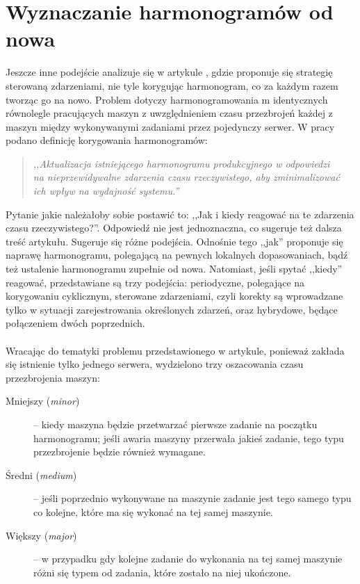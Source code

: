 \documentclass[archivemode]{mgr}
\begin{document}
\section{Wyznaczanie harmonogramów od nowa}
Jeszcze inne podejście analizuje się w artykule \cite{EDSBCR}, gdzie proponuje się strategię sterowaną zdarzeniami, nie tyle korygując harmonogram, co za każdym razem tworząc go na nowo. Problem dotyczy harmonogramowania m identycznych równolegle pracujących maszyn z uwzględnieniem czasu przezbrojeń każdej z maszyn między wykonywanymi zadaniami przez pojedynczy serwer. W pracy podano definicję korygowania harmonogramów:
\begin{quotation}
\emph{,,Aktualizacja istniejącego harmonogramu produkcyjnego w odpowiedzi\\ na nieprzewidywalne zdarzenia czasu rzeczywistego, aby zminimalizować\\ ich wpływ na wydajność systemu.''}
\end{quotation}
Pytanie jakie należałoby sobie postawić to: ,,Jak i kiedy reagować na te zdarzenia czasu rzeczywistego?''. Odpowiedź nie jest jednoznaczna, co sugeruje też dalsza treść artykułu. Sugeruje się różne podejścia. Odnośnie tego ,,jak'' proponuje się naprawę harmonogramu, polegającą na pewnych lokalnych dopasowaniach, bądź też ustalenie harmonogramu zupełnie od nowa. Natomiast, jeśli spytać ,,kiedy'' reagować,  przedstawiane są trzy podejścia: periodyczne, polegające na korygowaniu cyklicznym, sterowane zdarzeniami, czyli korekty są wprowadzane tylko w sytuacji zarejestrowania określonych zdarzeń, oraz hybrydowe, będące połączeniem dwóch poprzednich.\\\\
Wracając do tematyki problemu przedstawionego w artykule, ponieważ zakłada się istnienie tylko jednego serwera, wydzielono trzy oszacowania czasu przezbrojenia maszyn:
\begin{description}
    \item[Mniejszy (\emph{minor})] -- kiedy maszyna będzie przetwarzać pierwsze zadanie na początku harmonogramu; jeśli awaria maszyny przerwała jakieś zadanie, tego typu przezbrojenie będzie również wymagane.
    \item[Średni (\emph{medium})] -- jeśli poprzednio wykonywane na maszynie zadanie jest tego samego typu co kolejne, które ma się wykonać na tej samej maszynie.
    \item[Większy (\emph{major})] -- w przypadku gdy kolejne zadanie do wykonania na tej samej maszynie różni się typem od zadania, które zostało na niej ukończone.
\end{description}
\end{document}
